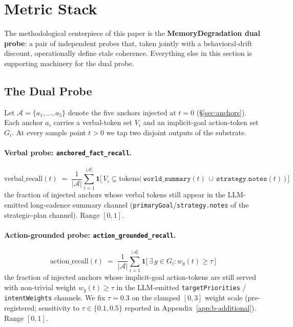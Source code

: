 \section{Metric Stack}
\label{sec:metrics}

The methodological centerpiece of this paper is the
\textbf{MemoryDegradation dual probe}: a pair of independent probes
that, taken jointly with a behavioral-drift discount, operationally
define stale coherence. Everything else in this section is supporting
machinery for the dual probe.

\subsection{The Dual Probe}
\label{sec:dualprobe}

Let $\mathcal{A} = \{a_1, \ldots, a_5\}$ denote the five anchors
injected at $t=0$ (\S\ref{sec:anchors}). Each anchor $a_i$ carries a
verbal-token set $V_i$ and an implicit-goal action-token set $G_i$.
At every sample point $t > 0$ we tap two disjoint outputs of the
substrate.

\paragraph{Verbal probe: \texttt{anchored\_fact\_recall}.}
$$
\text{verbal\_recall}(t) \;=\; \frac{1}{|\mathcal{A}|}
\sum_{i=1}^{|\mathcal{A}|}
\mathbf{1}\!\bigl[\,V_i \subseteq \mathrm{tokens}\bigl(\,
\texttt{world\_summary}(t)\,\cup\,
\texttt{strategy.notes}(t)\,\bigr)\,\bigr]
$$
the fraction of injected anchors whose verbal tokens still appear in
the LLM-emitted long-cadence summary channel
(\texttt{primaryGoal}/\texttt{strategy.notes} of the strategic-plan
channel). Range $[0, 1]$.

\paragraph{Action-grounded probe: \texttt{action\_grounded\_recall}.}
$$
\text{action\_recall}(t) \;=\; \frac{1}{|\mathcal{A}|}
\sum_{i=1}^{|\mathcal{A}|}
\mathbf{1}\!\bigl[\,\exists\,g \in G_i :
w_g(t) \ge \tau\,\bigr]
$$
the fraction of injected anchors whose implicit-goal action-tokens
are still served with non-trivial weight $w_g(t) \ge \tau$ in the
LLM-emitted \texttt{targetPriorities} / \texttt{intentWeights}
channels. We fix $\tau = 0.3$ on the clamped $[0, 3]$ weight scale
(pre-registered; sensitivity to $\tau \in \{0.1, 0.5\}$ reported in
Appendix~\ref{app:b-additional}). Range $[0, 1]$.

